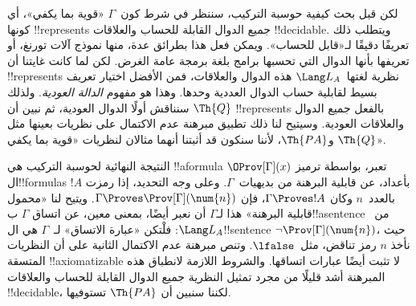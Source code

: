 \documentclass[../../../include/open-logic-section]{subfiles}
\begin{document}
لكن قبل بحث كيفية حوسبة التركيب، سننظر في شرط كون~$\Gamma$ «قوية بما
يكفي»، أي كونها !!{represents} جميع الدوال القابلة للحساب والعلاقات
!!{decidable}. ويتطلب ذلك تعريفًا دقيقًا لـ«قابل للحساب». ويمكن فعل
هذا بطرائق عدة، منها نموذج آلات تورنغ، أو تعريفها بأنها الدوال التي
تحسبها برامج بلغة برمجة عامة الغرض. لكن لما كانت غايتنا أن
!!{represents} نظرية لغتها~$\Lang L_A$ هذه الدوال والعلاقات، فمن الأفضل اختيار تعريف
بسيط لقابلية حساب الدوال العددية وحدها. وهذا هو مفهوم \emph{الدالة
العودية}. ولذلك سنناقش أولًا الدوال العودية، ثم نبين أن $\Th{Q}$
!!{represents} بالفعل جميع الدوال والعلاقات العودية. وسيتيح لنا ذلك
تطبيق مبرهنة عدم الاكتمال على نظريات بعينها مثل $\Th{Q}$ و$\Th{PA}$،
لأننا سنكون قد أثبتنا أنهما مثالان لنظريات «قوية بما يكفي».

النتيجة النهائية لحوسبة التركيب هي !!a{formula}
$\OProv[\Gamma](x)$ تعبر، بواسطة ترميز ال!!{formula}s بأعداد، عن
قابلية البرهنة من بديهيات~$\Gamma$. وعلى وجه التحديد، إذا رمزت
$!A$ بالعدد~$n$ وكان $\Gamma\Proves !A$، فإن
$\Gamma\Proves\Prov[\Gamma](\num{n})$. ويتيح لنا «محمول قابلية
البرهنة» هذا لـ$\Gamma$ أن نعبر أيضًا، بمعنى معين، عن اتساق
$\Gamma$ ب!!a{sentence} من~$\Lang L_A$: فلْتكن «عبارة الاتساق»
لـ~$\Gamma$ هي ال!!{sentence} $\lnot\Prov[\Gamma](\num{n})$، حيث
نأخذ $n$ رمز تناقض، مثل~$\lfalse$. وتنص مبرهنة عدم الاكتمال الثانية
على أن النظريات المتسقة !!{axiomatizable} لا تثبت أيضًا عبارات
اتساقها. والشروط اللازمة لانطباق هذه المبرهنة أشد قليلًا من مجرد
تمثيل النظرية جميع الدوال القابلة للحساب والعلاقات !!{decidable}،
لكننا سنبين أن $\Th{PA}$ تستوفيها.
\end{document}
